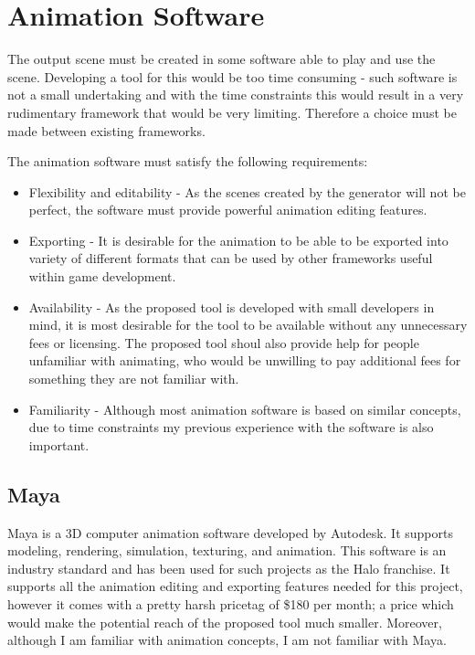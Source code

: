 \section{Animation Software}

The output scene must be created in some software able to play and use the scene. Developing a tool for this would be too time consuming - such software is not a small undertaking and with the time constraints this would result in a very rudimentary framework that would be very limiting. Therefore a choice must be made between existing frameworks.

The animation software must satisfy the following requirements:
\begin{itemize}
\item Flexibility and editability - As the scenes created by the generator will not be perfect, the software must provide powerful animation editing features.
\item Exporting - It is desirable for the animation to be able to be exported into variety of different formats that can be used by other frameworks useful within game development.
\item Availability - As the proposed tool is developed with small developers in mind, it is most desirable for the tool to be available without any unnecessary fees or licensing. The proposed tool shoul also provide help for people unfamiliar with animating, who would be unwilling to pay additional fees for something they are not familiar with.
\item Familiarity - Although most animation software is based on similar concepts, due to time constraints my previous experience with the software is also important.
\end{itemize}


\subsection{Maya}
Maya is a 3D computer animation software developed by Autodesk. It supports modeling, rendering, simulation, texturing, and animation. This software is an industry standard and has been used for such projects as the Halo franchise. It supports all the animation editing and exporting features needed for this project, however it comes with a pretty harsh pricetag of \$180 per month; a price which would make the potential reach of the proposed tool much smaller. Moreover, although I am familiar with animation concepts, I am not familiar with Maya.


